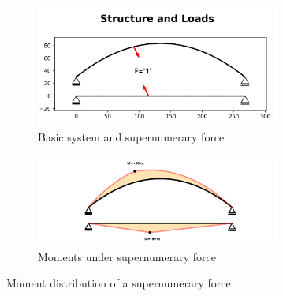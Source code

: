 \begin{figure}[H]
\centering
\begin{subfigure}{0.5\textwidth}
    \centering
    \vspace*{0.37cm}
    \includegraphics[trim={4cm 3cm 3cm 5.2cm},clip, width=0.88\textwidth]{illustrations/optimisation methods/overall optimisation single force.png}
    \vspace*{0.37cm}
    \caption{Basic system and supernumerary force}
    \label{fig:Minimisation_1}
\end{subfigure}%
\begin{subfigure}{.5\textwidth}
    \centering
    \includegraphics[trim={10cm 1cm 10cm 1cm},clip, width=0.88\textwidth]{illustrations/optimisation methods/overall optimisation single force moment.png}
    \caption{Moments under supernumerary force}
    \label{fig:Minimisation_2}
\end{subfigure}
\caption{Moment distribution of a supernumerary force}
\label{fig:Minimisation}
\end{figure}

